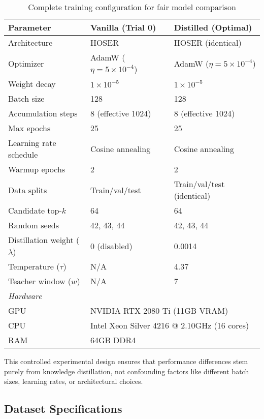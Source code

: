 \begin{table}[H]
\centering
\caption{Complete training configuration for fair model comparison}
\label{tab:training-config-appendix}
\begin{tabular}{lll}
\toprule
\textbf{Parameter} & \textbf{Vanilla (Trial 0)} & \textbf{Distilled (Optimal)} \\
\midrule
Architecture & HOSER & HOSER (identical) \\
Optimizer & AdamW ($\eta = 5 \times 10^{-4}$) & AdamW ($\eta = 5 \times 10^{-4}$) \\
Weight decay & $1 \times 10^{-5}$ & $1 \times 10^{-5}$ \\
Batch size & 128 & 128 \\
Accumulation steps & 8 (effective 1024) & 8 (effective 1024) \\
Max epochs & 25 & 25 \\
Learning rate schedule & Cosine annealing & Cosine annealing \\
Warmup epochs & 2 & 2 \\
Data splits & Train/val/test & Train/val/test (identical) \\
Candidate top-$k$ & 64 & 64 \\
Random seeds & 42, 43, 44 & 42, 43, 44 \\
\midrule
Distillation weight ($\lambda$) & 0 (disabled) & 0.0014 \\
Temperature ($\tau$) & N/A & 4.37 \\
Teacher window ($w$) & N/A & 7 \\
\midrule
\multicolumn{3}{l}{\textit{Hardware}} \\
\quad GPU & \multicolumn{2}{l}{NVIDIA RTX 2080 Ti (11GB VRAM)} \\
\quad CPU & \multicolumn{2}{l}{Intel Xeon Silver 4216 @ 2.10GHz (16 cores)} \\
\quad RAM & \multicolumn{2}{l}{64GB DDR4} \\
\bottomrule
\end{tabular}
\end{table}

This controlled experimental design ensures that performance differences stem purely from knowledge distillation, not confounding factors like different batch sizes, learning rates, or architectural choices.

\subsection{Dataset Specifications}
\label{app:datasets}

